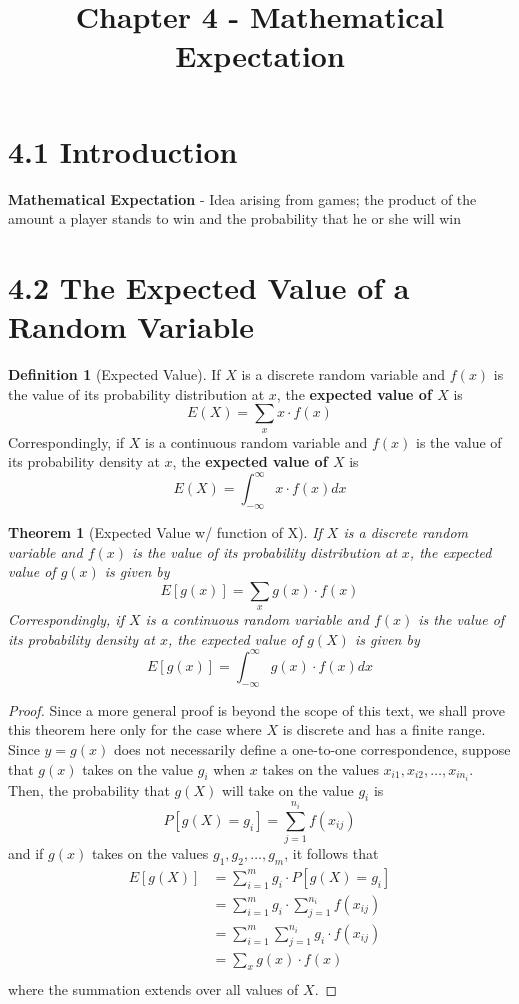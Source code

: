 \documentclass[
10pt,reqno
]{amsart}
\title{Chapter 4 - Mathematical Expectation}
\newtheorem{theorem}{Theorem}[section]
\theoremstyle{definition}
\newtheorem{definition}{Definition}[section]
\begin{document}
\maketitle


\section*{4.1 Introduction}

\textbf{Mathematical Expectation} - Idea arising from games; the product of the amount a player stands to win and the probability that he or she will win

\section*{4.2 The Expected Value of a Random Variable}

\begin{definition}[Expected Value]
If \(X\) is a discrete random variable and \(f(x)\) is the value of its probability distribution at \(x\), the \textbf{expected value of \(X\)} is
\[
E(X)= \underset{x} \sum x \cdot f(x)
\]
Correspondingly, if \(X\) is a continuous random variable and \(f(x)\) is the value of its probability density at \(x\), the \textbf{expected value of \(X\)} is
\[
E(X)=\int_{- \infty}^{\infty} x \cdot f(x) dx
\]
\end{definition}

\begin{theorem}[Expected Value w/ function of X]
\label{thm:ExpValwFunctionX}
If \(X\) is a discrete random variable and \(f(x)\) is the value of its probability distribution at \(x\), the expected value of \(g(x)\) is given by
\[
E[g(x)]= \underset{x}\sum g(x) \cdot f(x)
\]
Correspondingly, if \(X\) is a continuous random variable and \(f(x)\) is the value of its probability density at \(x\), the expected value of \(g(X)\) is given by
\[
E[g(x)]=\int_{- \infty}^{ \infty } g(x) \cdot f(x) dx
\]
\end{theorem}

\begin{proof}
Since a more general proof is beyond the scope of this text, we shall prove this theorem here only for the case where \(X\) is discrete and has a finite range. Since \(y=g(x)\) does not necessarily define a one-to-one correspondence, suppose that \(g(x)\) takes on the value \(g_i\) when \(x\) takes on the values \(x_{i1},x_{i2},\ldots,x_{in_i}\). Then, the probability that \(g(X)\) will take on the value \(g_i\) is
\[
P[g(X)=g_i] = \sum_{j=1}^{n_i}f(x_{ij})
\]
and if \(g(x)\) takes on the values \(g_1,g_2,\ldots,g_m\), it follows that
\begin{align*}
E[g(X)]&= \sum_{i=1}^m g_i \cdot P[g(X)=g_i]\\
&= \sum_{i=1}^m g_i \cdot \sum_{j=1}^{n_i} f(x_{ij})\\
&= \sum_{i=1}^m \sum_{j=1}^{n_i} g_i \cdot f(x_{ij})\\
&= \sum_{x} g(x) \cdot f(x)\\
\end{align*}
where the summation extends over all values of \(X\).
\end{proof}
\end{document}
